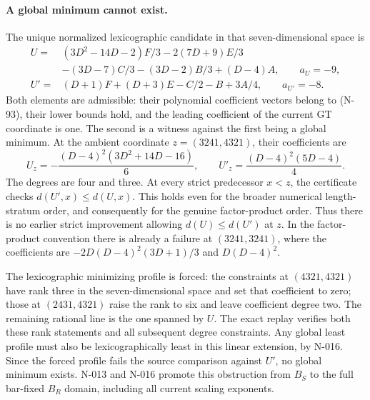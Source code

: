\paragraph{A global minimum cannot exist.}
The unique normalized lexicographic candidate in that seven-dimensional
space is
\[
\begin{split}
 U={}&(3D^2-14D-2)F/3-2(7D+9)E/3\\
     &-(3D-7)C/3-(3D-2)B/3+(D-4)A,
          \qquad a_U=-9,\\
 U'={}&(D+1)F+(D+3)E-C/2-B+3A/4,
          \qquad a_{U'}=-8.
\end{split}
\tag{N-94}
\]
Both elements are admissible: their polynomial coefficient vectors
belong to (N-93), their lower bounds hold, and the leading coefficient
of the current GT coordinate is one.  The second is a witness against
the first being a global minimum.  At the ambient coordinate
$z=(3241,4321)$, their coefficients are
\[
 U_z=-\frac{(D-4)^2(3D^2+14D-16)}6,
 \qquad
 U'_z=\frac{(D-4)^2(5D-4)}4.
 \tag{N-95}
\]
The degrees are four and three.  At every strict predecessor $x<z$,
the certificate checks $d(U',x)\le d(U,x)$.
This holds even for the broader numerical length-stratum order,
and consequently for the genuine factor-product order.  Thus there
is no earlier strict improvement allowing $d(U)\le d(U')$ at $z$.
In the factor-product convention there is already a failure at
$(3241,3241)$, where the coefficients are
$-2D(D-4)^2(3D+1)/3$ and $D(D-4)^2$.

The lexicographic minimizing profile is forced: the constraints at
$(4321,4321)$ have rank three in the seven-dimensional space and
set that coefficient to zero; those at $(2431,4321)$ raise the rank
to six and leave coefficient degree two.  The remaining rational
line is the one spanned by $U$.  The exact replay verifies both
these rank statements and all subsequent degree constraints.
Any global least profile must also be lexicographically least in
this linear extension, by N-016.  Since the forced profile fails
the source comparison against $U'$, no global minimum exists.
N-013 and N-016 promote this obstruction from $B_S$ to the full
bar-fixed $B_R$ domain, including all current scaling exponents.

